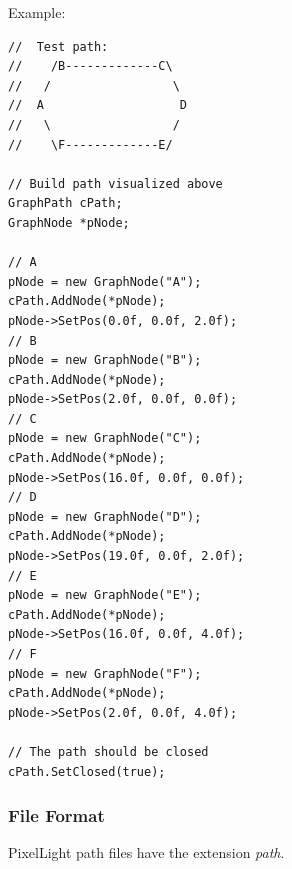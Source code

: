 Example:

\begin{lstlisting}[caption=Path creation example]
//	Test path:
//	  /B-------------C\
//	 /                 \
//	A                   D
//	 \                 /
//	  \F-------------E/

// Build path visualized above
GraphPath cPath;
GraphNode *pNode;

// A
pNode = new GraphNode("A");
cPath.AddNode(*pNode);
pNode->SetPos(0.0f, 0.0f, 2.0f);
// B
pNode = new GraphNode("B");
cPath.AddNode(*pNode);
pNode->SetPos(2.0f, 0.0f, 0.0f);
// C
pNode = new GraphNode("C");
cPath.AddNode(*pNode);
pNode->SetPos(16.0f, 0.0f, 0.0f);
// D
pNode = new GraphNode("D");
cPath.AddNode(*pNode);
pNode->SetPos(19.0f, 0.0f, 2.0f);
// E
pNode = new GraphNode("E");
cPath.AddNode(*pNode);
pNode->SetPos(16.0f, 0.0f, 4.0f);
// F
pNode = new GraphNode("F");
cPath.AddNode(*pNode);
pNode->SetPos(2.0f, 0.0f, 4.0f);

// The path should be closed
cPath.SetClosed(true);
\end{lstlisting}



\subsubsection{File Format}
PixelLight path files have the extension \emph{path}.
